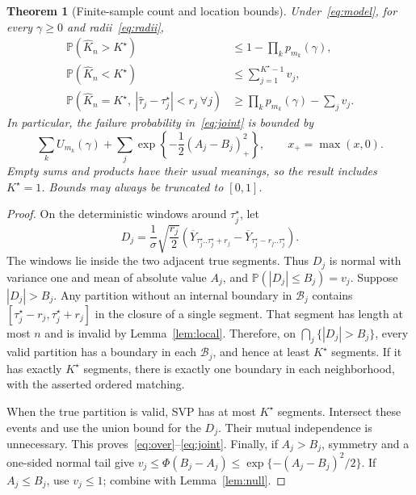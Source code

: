 \documentclass[pdflatex,sn-mathphys-num]{sn-jnl}
\newcommand{\Prob}{\mathbb P}
\newcommand{\taus}{\tau^\star}
\newcommand{\Kh}{\widehat K_n}
\theoremstyle{thmstyleone}
\newtheorem{theorem}{Theorem}
\theoremstyle{thmstyletwo}
\begin{document}
\begin{theorem}[Finite-sample count and location bounds]\label{thm:finite}
Under~\eqref{eq:model}, for every $\gamma\ge0$ and radii~\eqref{eq:radii},
\begin{align}
\Prob(\Kh>K^\star)&\le1-\prod_kp_{m_k}(\gamma),\label{eq:over}\\
\Prob(\Kh<K^\star)&\le\sum_{j=1}^{K^\star-1}v_j,\label{eq:under}\\
\Prob\left(\Kh=K^\star,\ |\widehat\tau_j-\taus_j|<r_j\ \forall j\right)
&\ge\prod_kp_{m_k}(\gamma)-\sum_jv_j.\label{eq:joint}
\end{align}
In particular, the failure probability in~\eqref{eq:joint} is bounded by
\begin{equation}\label{eq:failure-bound}
\sum_k U_{m_k}(\gamma)+
\sum_j\exp\left\{-\frac12(A_j-B_j)_+^2\right\},
\qquad x_+=\max(x,0).
\end{equation}
Empty sums and products have their usual meanings, so the result includes
$K^\star=1$. Bounds may always be truncated to $[0,1]$.
\end{theorem}
\begin{proof}
On the deterministic windows around $\taus_j$, let
\[
D_j=\frac{1}{\sigma}\sqrt{\frac{r_j}{2}}
  (\overline Y_{\taus_j..\taus_j+r_j}
    -\overline Y_{\taus_j-r_j..\taus_j}).
\]
The windows lie inside the two adjacent true segments. Thus $D_j$ is normal
with variance one and mean of absolute value $A_j$, and
$\Prob(|D_j|\le B_j)=v_j$.
Suppose $|D_j|>B_j$. Any partition without an internal boundary in
$\mathcal B_j$ contains $[\taus_j-r_j,\taus_j+r_j]$ in the closure of a single
segment. That segment has length at most $n$ and is invalid by
Lemma~\ref{lem:local}. Therefore, on $\bigcap_j\{|D_j|>B_j\}$, every valid
partition has a boundary in each $\mathcal B_j$, and hence at least $K^\star$
segments. If it has exactly $K^\star$ segments, there is exactly one boundary
in each neighborhood, with the asserted ordered matching.

When the true partition is valid, SVP has at most $K^\star$ segments.
Intersect these events and use the union bound for the $D_j$. Their mutual
independence is unnecessary. This proves~\eqref{eq:over}--\eqref{eq:joint}.
Finally, if $A_j>B_j$, symmetry and a one-sided normal tail give
$v_j\le\Phi(B_j-A_j)\le\exp\{-(A_j-B_j)^2/2\}$.
If $A_j\le B_j$, use $v_j\le1$; combine with Lemma~\ref{lem:null}.
\end{proof}
\end{document}
